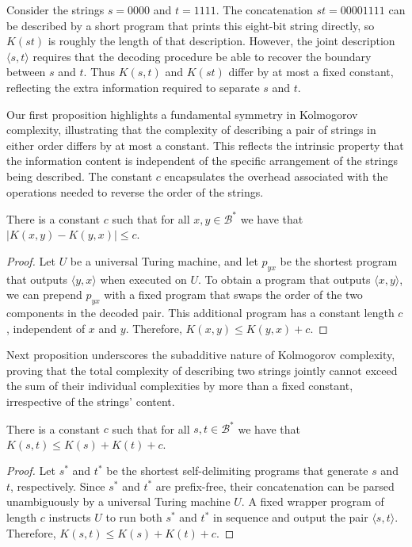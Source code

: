 \begin{example}
Consider the strings $s = 0000$ and $t = 1111$. The concatenation $st = 00001111$ can be described by a short program that prints this eight-bit string directly, so $K(st)$ is roughly the length of that description. However, the joint description $\langle s,t\rangle$ requires that the decoding procedure be able to recover the boundary between $s$ and $t$. Thus $K(s,t)$ and $K(st)$ differ by at most a fixed constant, reflecting the extra information required to separate $s$ and $t$. 
\end{example}

Our first proposition highlights a fundamental symmetry in Kolmogorov complexity, illustrating that the complexity of describing a pair of strings in either order differs by at most a constant. This reflects the intrinsic property that the information content is independent of the specific arrangement of the strings being described. The constant $c$ encapsulates the overhead associated with the operations needed to reverse the order of the strings.

\begin{proposition}
\label{prop:kolmogorov_order}
There is a constant $c$ such that for all $x, y \in\mathcal{B}^{\ast}$ we have that $| K(x, y) - K(y, x) | \le c$.
\end{proposition}
\begin{proof}
Let $U$ be a universal Turing machine, and let $p_{yx}$ be the shortest program that outputs $\langle y,x\rangle$ when executed on $U$. To obtain a program that outputs $\langle x,y\rangle$, we can prepend $p_{yx}$ with a fixed program that swaps the order of the two components in the decoded pair. This additional program has a constant length $c$, independent of $x$ and $y$. Therefore, $K(x,y) \leq K(y,x) + c$.
\end{proof}

Next proposition underscores the subadditive nature of Kolmogorov complexity, proving that the total complexity of describing two strings jointly cannot exceed the sum of their individual complexities by more than a fixed constant, irrespective of the strings' content.

\begin{proposition}
\label{prop:additive_kolmogorov}
There is a constant $c$ such that for all $s, t \in\mathcal{B}^{\ast}$ we have that $K(s, t) \leq K(s) + K(t) + c$.
\end{proposition}
\begin{proof}
Let $s^\ast$ and $t^\ast$ be the shortest self-delimiting programs that generate $s$ and $t$, respectively. Since $s^\ast$ and $t^\ast$ are prefix-free, their concatenation can be parsed unambiguously by a universal Turing machine $U$. A fixed wrapper program of length $c$ instructs $U$ to run both $s^\ast$ and $t^\ast$ in sequence and output the pair $\langle s,t\rangle$. Therefore, $K(s,t) \leq K(s) + K(t) + c$.
\end{proof}

